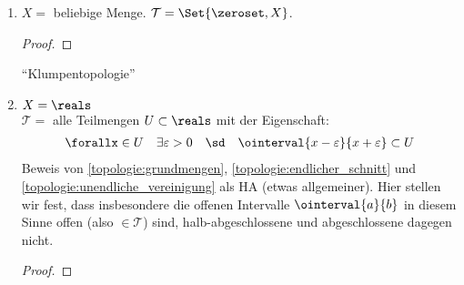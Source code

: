 \begin{beispiele}
    \begin{enumerate}
        \item \label{klumpentopologie}\( X= \) beliebige Menge. \( \mathcal{T}=\Set{\zeroset, X} \).
        \begin{proof}
        \end{proof}
        \enquote{Klumpentopologie}
        
        \item \label{standard-topologie}\( X=\reals \)\\
        \( \mathcal{T}= \) alle Teilmengen \( U\subset \reals \) mit der Eigenschaft:
        \begin{align*}
            \forallx\in U\quad\exists\varepsilon>0\quad\sd\quad \ointerval{x-\varepsilon}{x+\varepsilon}\subset U
        \end{align*}
        Beweis von \ref{topologie:grundmengen}, \ref{topologie:endlicher_schnitt} und \ref{topologie:unendliche_vereinigung} als HA (etwas allgemeiner).
        Hier stellen wir fest, dass insbesondere die offenen Intervalle \( \ointerval{a}{b} \) in diesem Sinne offen (also \( \in \mathcal{T} \)) sind, halb-abgeschlossene und abgeschlossene dagegen nicht.
        \begin{proof}
            

\end{proof}
\end{enumerate}
\end{beispiele}
